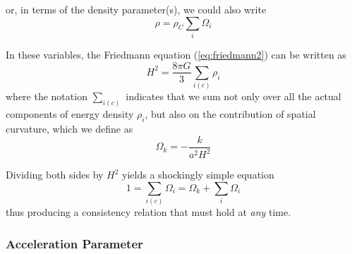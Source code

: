 or, in terms of the density parameter(s), we could also write 
\begin{equation}
    \rho = \rho_{C}\sum_{i}\Omega_{i}
\end{equation}
\par In these variables, the Friedmann equation (\ref{eq:friedmann2}) can be written as
\begin{equation}
    H^{2} = \frac{8\pi G}{3}\sum_{i(c)}\rho_{i}
    \label{eq:friedmann_alt}
\end{equation}
where the notation $\sum_{i(c)}$ indicates that we sum not only over all the actual components of energy density $\rho_{i}$, but also on the contribution of spatial curvature, which we define as
\begin{equation}
    \Omega_{k} = -\frac{k}{a^{2}H^{2}}
    \label{eq:spatial_dp}
\end{equation}
\par Dividing both sides by $H^{2}$ yields a shockingly simple equation
\begin{equation}
    1 = \sum_{i(c)}\Omega_{i} = \Omega_{k} + \sum_{i}\Omega_{i}
\end{equation}
thus producing a consistency relation that must hold at \emph{any} time.

\subsubsection{Acceleration Parameter}

